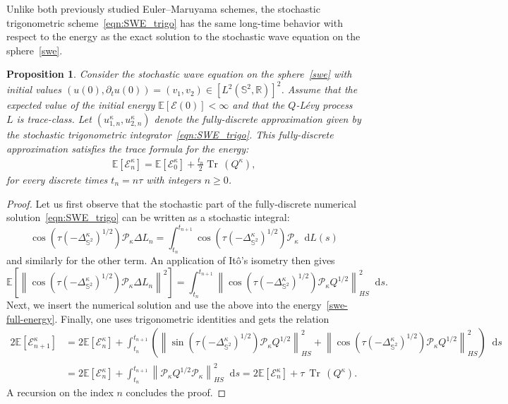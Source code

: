 \documentclass[11pt]{amsart}
\newtheorem{proposition}[theorem]{Proposition}
\newcommand{\R}{{\mathbb R}}
\newcommand{\E}{{\mathbb E}}
\newcommand{\IS}{\mathbb{S}}
\newcommand{\tr}{{\operatorname{Tr}\, }}
\newcommand{\cE}{\mathcal E}
\providecommand{\norm}[1]{\left\lVert#1\right\rVert}
\newcommand*\dd{\mathop{}\!\mathrm{d}}
\newcommand{\Deltalb}{\Delta_{\IS^2}}
\newcommand{\cP}{\mathcal{P}}
\begin{document}
Unlike both previously studied Euler--Maruyama schemes, the stochastic trigonometric scheme~\eqref{eqn:SWE_trigo} has the same long-time behavior with respect to the energy as the exact solution to the stochastic wave equation on the sphere~\eqref{swe}.
\begin{proposition}\label{prop:energy-trigo}
Consider the stochastic wave equation on the sphere~\eqref{swe} with initial values $(u(0),\partial_tu(0))=(v_1,v_2)\in [L^2(\IS^2,\R)]^2$.
Assume that the expected value of the initial energy $\E\left[\mathcal{E}(0)\right]<\infty$ and that the $Q$-L\'evy process $L$ is trace-class.
Let $(u_{1,n}^\kappa, u_{2,n}^\kappa)$ denote the fully-discrete approximation given by the stochastic trigonometric integrator~\eqref{eqn:SWE_trigo}.
This fully-discrete approximation satisfies the trace formula for the energy:
\begin{align*}
\E\left[\mathcal{E}^\kappa_n\right]=\E\left[\mathcal{E}^\kappa_0\right]+\frac{t_n}2\tr(Q^\kappa),
\end{align*}
for every discrete times $t_n=n\tau$ with integers $n\geq0$.
\end{proposition}
\begin{proof}
Let us first observe that the stochastic part of the fully-discrete numerical solution~\eqref{eqn:SWE_trigo} can be written as a stochastic 
integral:
$$
\cos(\tau(-\Deltalb^\kappa)^{1/2})\cP_\kappa\Delta L_{n}=
\int_{t_{n}}^{t_{n+1}}\cos(\tau(-\Deltalb^\kappa)^{1/2})\cP_\kappa\dd L(s)
$$
and similarly for the other term. An application of It\^o's isometry then gives 
$$
\E\left[\norm{\cos(\tau(-\Deltalb^\kappa)^{1/2})\cP_\kappa\Delta L_{n}}^2\right]=
\int_{t_{n}}^{t_{n+1}}\norm{\cos(\tau(-\Deltalb^\kappa)^{1/2})\cP_\kappa Q^{1/2}}_{HS}^2\dd s.
$$
Next, we insert the numerical solution and use the above into the energy~\eqref{swe-full-energy}.
Finally, one uses trigonometric identities and gets the relation
\begin{align*}
2\E\left[\cE^\kappa_{n+1}\right] &= 2\E\left[\cE^\kappa_{n}\right] +\int_{t_{n}}^{t_{n+1}}\left(\norm{\sin(\tau(-\Deltalb^\kappa)^{1/2})\cP_\kappa Q^{1/2}}^2_{HS}+\norm{\cos(\tau(-\Deltalb^\kappa)^{1/2})\cP_\kappa Q^{1/2}}_{HS}^2\right)\dd s\\
&=2\E\left[\cE^\kappa_n\right] +\int_{t_{n}}^{t_{n+1}}\norm{\cP_\kappa  Q^{1/2}\cP_\kappa}^2_{HS}\dd s= 2\E\left[\cE^\kappa_n\right]+\tau\ \tr(Q^\kappa).
\end{align*}
A recursion on the index $n$ concludes the proof.
\end{proof}
\end{document}
